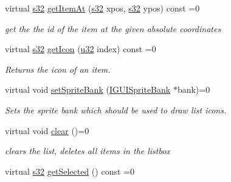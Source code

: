 \begin{DoxyCompactItemize}
virtual \hyperlink{namespaceirr_ac66849b7a6ed16e30ebede579f9b47c6}{s32} \hyperlink{classirr_1_1gui_1_1IGUIListBox_a8e1fe86805d9b970b89878291f0ccd25}{get\+Item\+At} (\hyperlink{namespaceirr_ac66849b7a6ed16e30ebede579f9b47c6}{s32} xpos, \hyperlink{namespaceirr_ac66849b7a6ed16e30ebede579f9b47c6}{s32} ypos) const =0
\begin{DoxyCompactList}\small\item\em get the the id of the item at the given absolute coordinates \end{DoxyCompactList}\item 
\mbox{\label{classirr_1_1gui_1_1IGUIListBox_a8e5f9751a7a1a32dde5a243733b3ddc6}} 
virtual \hyperlink{namespaceirr_ac66849b7a6ed16e30ebede579f9b47c6}{s32} \hyperlink{classirr_1_1gui_1_1IGUIListBox_a8e5f9751a7a1a32dde5a243733b3ddc6}{get\+Icon} (\hyperlink{namespaceirr_a0416a53257075833e7002efd0a18e804}{u32} index) const =0
\begin{DoxyCompactList}\small\item\em Returns the icon of an item. \end{DoxyCompactList}\item 
virtual void \hyperlink{classirr_1_1gui_1_1IGUIListBox_ad139cef6f71bb8d36624b48e8a695ed4}{set\+Sprite\+Bank} (\hyperlink{classirr_1_1gui_1_1IGUISpriteBank}{I\+G\+U\+I\+Sprite\+Bank} $\ast$bank)=0
\begin{DoxyCompactList}\small\item\em Sets the sprite bank which should be used to draw list icons. \end{DoxyCompactList}\item 
\mbox{\label{classirr_1_1gui_1_1IGUIListBox_aaffa1f9f823dbb254c1901dba67e31c4}} 
virtual void \hyperlink{classirr_1_1gui_1_1IGUIListBox_aaffa1f9f823dbb254c1901dba67e31c4}{clear} ()=0
\begin{DoxyCompactList}\small\item\em clears the list, deletes all items in the listbox \end{DoxyCompactList}\item 
\mbox{\label{classirr_1_1gui_1_1IGUIListBox_a321626d92d63ce5c309466201a02b12d}} 
virtual \hyperlink{namespaceirr_ac66849b7a6ed16e30ebede579f9b47c6}{s32} \hyperlink{classirr_1_1gui_1_1IGUIListBox_a321626d92d63ce5c309466201a02b12d}{get\+Selected} () const =0

\end{DoxyCompactItemize}
